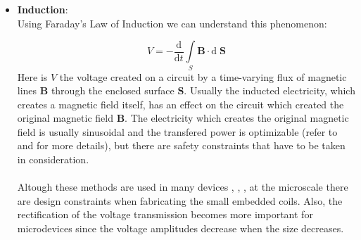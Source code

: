 \begin{itemize}
\item \textbf{Induction}: \\ Using Faraday's Law of Induction we can understand this phenomenon:

\begin{equation}
V = -\frac{\textrm{d}}{\textrm{d}t}\int\limits_S \textbf{B}\cdot \textrm{d}\;\textbf{S}
\end{equation}
Here is $V$ the voltage created on a circuit by a time-varying flux of magnetic lines $\textbf{B}$ through the enclosed surface $\textbf{S}$. Usually the inducted electricity, which creates a magnetic field itself, has an effect on the circuit which created the original magnetic field $\textbf{B}$. The electricity which creates the original magnetic field is usually sinusoidal and the transfered power is optimizable (refer to \cite{bansal2006} and \cite{Theodoridis2005} for more details), but there are safety constraints that have to be taken in consideration. \\\\
Altough these methods are used in many devices \cite{Theodoridis2005}, \cite{Protection1998}, \cite{Lenaerts2007}, at the microscale there are design constraints when fabricating the small embedded coils. Also, the rectification of the voltage transmission becomes more important for microdevices since the voltage amplitudes decrease when the size decreases.


\end{itemize}
